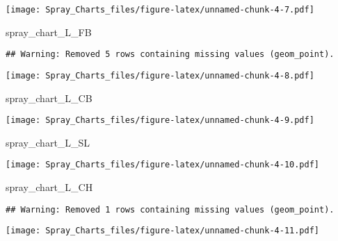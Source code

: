 \documentclass[]{article}
\newenvironment{Shaded}{\begin{snugshade}}{\end{snugshade}}
\newcommand{\NormalTok}[1]{#1}
\begin{document}
\texttt{[image: Spray\_Charts\_files/figure-latex/unnamed-chunk-4-7.pdf]}

\begin{Shaded}
\begin{Highlighting}[]
\NormalTok{spray_chart_L_FB}
\end{Highlighting}
\end{Shaded}

\begin{verbatim}
## Warning: Removed 5 rows containing missing values (geom_point).
\end{verbatim}

\texttt{[image: Spray\_Charts\_files/figure-latex/unnamed-chunk-4-8.pdf]}

\begin{Shaded}
\begin{Highlighting}[]
\NormalTok{spray_chart_L_CB}
\end{Highlighting}
\end{Shaded}

\texttt{[image: Spray\_Charts\_files/figure-latex/unnamed-chunk-4-9.pdf]}

\begin{Shaded}
\begin{Highlighting}[]
\NormalTok{spray_chart_L_SL}
\end{Highlighting}
\end{Shaded}

\texttt{[image: Spray\_Charts\_files/figure-latex/unnamed-chunk-4-10.pdf]}

\begin{Shaded}
\begin{Highlighting}[]
\NormalTok{spray_chart_L_CH}
\end{Highlighting}
\end{Shaded}

\begin{verbatim}
## Warning: Removed 1 rows containing missing values (geom_point).
\end{verbatim}

\texttt{[image: Spray\_Charts\_files/figure-latex/unnamed-chunk-4-11.pdf]}
\end{document}
